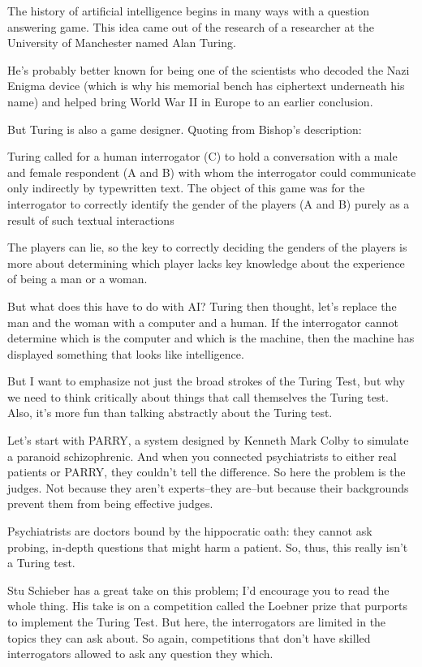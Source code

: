 The history of artificial intelligence begins in many ways with a question answering game.  This idea came out of the research of a researcher at the University of Manchester named Alan Turing.  

He’s probably better known for being one of the scientists who decoded the Nazi Enigma device (which is why his memorial bench has ciphertext underneath his name) and helped bring World War II in Europe to an earlier conclusion.

But Turing is also a game designer.  Quoting from Bishop’s description:

Turing called for a human interrogator (C) to hold a conversation with a male and female respondent (A and B) with whom the interrogator could communicate only indirectly by typewritten text. The object of this game was for the interrogator to correctly identify the gender of the players (A and B) purely as a result of such textual interactions

The players can lie, so the key to correctly deciding the genders of the players is more about determining which player lacks key knowledge about the experience of being a man or a woman.

But what does this have to do with AI?  Turing then thought, let’s replace the man and the woman with a computer and a human.  If the interrogator cannot determine which is the computer and which is the machine, then the machine has displayed something that looks like intelligence.

But I want to emphasize not just the broad strokes of the Turing Test, but why we need to think critically about things that call themselves the Turing test.  Also, it’s more fun than talking abstractly about the Turing test.

Let’s start with PARRY, a system designed by Kenneth Mark Colby to simulate a paranoid schizophrenic.  And when you connected psychiatrists to either real patients or PARRY, they couldn’t tell the difference.  So here the problem is the judges.  Not because they aren’t experts--they are--but because their backgrounds prevent them from being effective judges.

Psychiatrists are doctors bound by the hippocratic oath: they cannot ask probing, in-depth questions that might harm a patient.  So, thus, this really isn’t a Turing test.

Stu Schieber has a great take on this problem; I’d encourage you to read the whole thing.  His take is on a competition called the Loebner prize that purports to implement the Turing Test.  But here, the interrogators are limited in the topics they can ask about.  So again, competitions that don’t have skilled interrogators allowed to ask any question they which.


